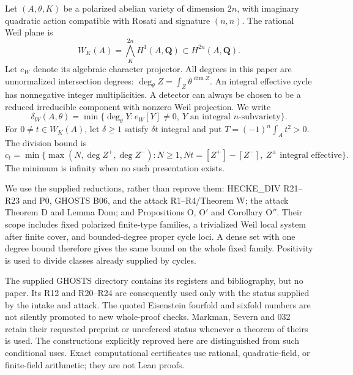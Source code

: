 \documentclass[11pt]{article}
\theoremstyle{remark}\newtheorem{remark}[theorem]{Remark}
\newcommand{\Q}{\mathbf Q}\newcommand{\Z}{\mathbf Z}
\begin{document}
Let $(A,\theta,K)$ be a polarized abelian variety of dimension $2n$, with
imaginary quadratic action compatible with Rosati and signature $(n,n)$.
The rational Weil plane is
\[
 W_K(A)=\bigwedge_K^{2n}H^1(A,\Q)\subset H^{2n}(A,\Q).
\]
Let $e_W$ denote its algebraic character projector. All degrees in this
paper are unnormalized intersection degrees:
$\deg_\theta Z=\int_Z\theta^{\dim Z}$.
An integral effective cycle has nonnegative integer multiplicities.
A detector can always be chosen to be a reduced irreducible component
with nonzero Weil projection. We write
\[
 \delta_W(A,\theta)=\min\{\deg_\theta Y:e_W[Y]\ne0,\ Y
 \text{ an integral }n\text{-subvariety}\}.
\]
For $0\ne t\in W_K(A)$, let $\delta\ge1$ satisfy $\delta t$ integral
and put $T=(-1)^n\int_A t^2>0$. The division bound is
\[
 c_t=\min\{\max(N,\deg Z^+,\deg Z^-):
 N\ge1, Nt=[Z^+]-[Z^-],\ Z^\pm\text{ integral effective}\}.
\]
The minimum is infinity when no such presentation exists.

We use the supplied reductions, rather than reprove them: HECKE\_DIV
R21--R23 and P0, GHOSTS B06, and the attack R1--R4/Theorem W;
the attack Theorem D and Lemma Dom; and Propositions O, O$'$ and
Corollary O$''$. Their scope includes fixed polarized finite-type
families, a trivialized Weil local system after finite cover, and
bounded-degree proper cycle loci. A dense set with one degree bound
therefore gives the same bound on the whole fixed family. Positivity
is used to divide classes already supplied by cycles.

The supplied GHOSTS directory contains its registers and bibliography,
but no paper. Its R12 and R20--R24 are consequently used only with the
status supplied by the intake and attack. The quoted Eisenstein
fourfold and sixfold numbers are not silently promoted to new
whole-proof checks. Markman, Severn and 032 retain their requested
preprint or unrefereed status whenever a theorem of theirs is used.
The constructions explicitly reproved here are distinguished from
such conditional uses. Exact computational certificates use rational,
quadratic-field, or finite-field arithmetic; they are not Lean proofs.
\end{document}
